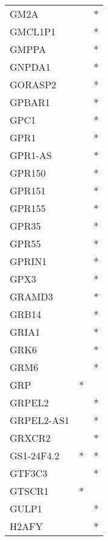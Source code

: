 \begin{longtable}{lcc}
GM2A            &                &          * \\
GMCL1P1         &                &          * \\
GMPPA           &                &          * \\
GNPDA1          &                &          * \\
GORASP2         &                &          * \\
GPBAR1          &                &          * \\
GPC1            &                &          * \\
GPR1            &                &          * \\
GPR1-AS         &                &          * \\
GPR150          &                &          * \\
GPR151          &                &          * \\
GPR155          &                &          * \\
GPR35           &                &          * \\
GPR55           &                &          * \\
GPRIN1          &                &          * \\
GPX3            &                &          * \\
GRAMD3          &                &          * \\
GRB14           &                &          * \\
GRIA1           &                &          * \\
GRK6            &                &          * \\
GRM6            &                &          * \\
GRP             &              * &            \\
GRPEL2          &                &          * \\
GRPEL2-AS1      &                &          * \\
GRXCR2          &                &          * \\
GS1-24F4.2      &              * &          * \\
GTF3C3          &                &          * \\
GTSCR1          &              * &            \\
GULP1           &                &          * \\
H2AFY           &                &          * \\

\end{longtable}
